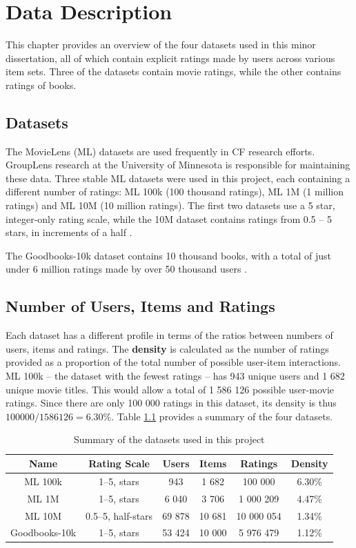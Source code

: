 \chapter{Data Description}
This chapter provides an overview of the four datasets used in this minor dissertation, all of which contain explicit ratings made by users across various item sets. Three of the datasets contain movie ratings, while the other contains ratings of books.

\section{Datasets}
The MovieLens (ML) datasets are used frequently in CF research efforts. GroupLens research at the University of Minnesota is responsible for maintaining these data. Three stable ML datasets were used in this project, each containing a different number of ratings: ML 100k (100 thousand ratings),  ML 1M (1 million ratings) and ML 10M (10 million ratings). The first two datasets use a 5 star, integer-only rating scale, while the 10M dataset contains ratings from 0.5 -- 5 stars, in increments of a half \parencite{harper2016movielens}.

The Goodbooks-10k dataset contains 10 thousand books, with a total of just under 6 million ratings made by over 50 thousand users \parencite{goodbooks2017}.

\section{Number of Users, Items and Ratings}
Each dataset has a different profile in terms of the ratios between numbers of users, items and ratings. The \textbf{density} is calculated as the number of ratings provided as a proportion of the total number of possible user-item interactions. ML 100k -- the dataset with the fewest ratings -- has 943 unique users and 1 682 unique movie titles. This would allow a total of 1 586 126 possible user-movie ratings. Since there are only 100 000 ratings in this dataset, its density is thus $100000/1586126 = 6.30\%$. Table \ref{tab:data-summary} provides a summary of the four datasets.

\begin{table}[H]
\centering
\begin{tabular}{c | c | c | c | c | c}
\toprule
\textbf{Name} & \textbf{Rating Scale} & \textbf{Users} & \textbf{Items} & \textbf{Ratings} & \textbf{Density} \\
\midrule
ML 100k & 1--5, stars & 943 & 1 682 & 100 000 & 6.30\% \\
ML 1M & 1--5, stars & 6 040 & 3 706 & 1 000 209 & 4.47\% \\
ML 10M & 0.5--5, half-stars & 69 878 & 10 681 & 10 000 054 & 1.34\% \\
Goodbooks-10k & 1--5, stars & 53 424 & 10 000 & 5 976 479 & 1.12\% \\
\bottomrule
\end{tabular}
\caption[Data summary]{Summary of the datasets used in this project}
\label{tab:data-summary}
\end{table}

